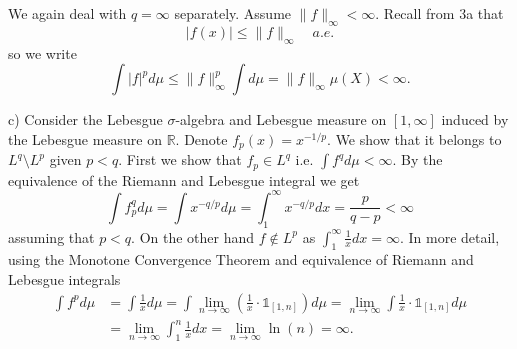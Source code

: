 \documentclass[12pt]{amsart} %
\def\1{\mathbb{1}}
\begin{document}
We again deal with $q = \infty$ separately. Assume $\|f\|_\infty < \infty$. Recall from 3a that $$|f(x)| \le \|f\|_\infty \quad a.e.$$ so we write $$
\int |f|^p d\mu \le  \|f\|_\infty^p \int d\mu = \|f\|_\infty \mu(X) < \infty.$$ 

 \smallskip
 c) Consider the Lebesgue $\sigma$-algebra and Lebesgue measure on $[1,\infty]$ induced by the Lebesgue measure on $\mathbb{R}$. Denote $f_p(x) = x^{-1/p}$. We show that it belongs to  $L^q \setminus L^p$ given $p < q$. First we show that $f_p \in L^q$ i.e. $\int f^q d\mu < \infty$. By the equivalence of the Riemann and Lebesgue integral we get $$\int f_p^q d\mu = \int x^{-q/p} d\mu = \int_1^{\infty} x^{-q/p} dx = \frac{p}{q-p} < \infty$$ assuming that $p < q$. On the other hand $ f \notin L^p$ as  $\int_1^\infty \frac{1}{x} dx = \infty$. In more detail, using the Monotone Convergence Theorem and equivalence of Riemann and Lebesgue integrals
\begin{align*}
	\int f^p d\mu &= \int \frac{1}{x}d\mu= \int \lim_{n \to \infty} \left(\frac{1}{x}\cdot \1_{[1,n]}\right)d\mu = \lim_{n \to \infty} \int \frac{1}{x}\cdot \1_{[1,n]}d\mu \\
 &= \lim_{n \to \infty} \int_1^n \frac{1}{x} dx  = \lim_{n \to \infty} \ln\left( n \right) = \infty.
\end{align*}

  
\end{document}
